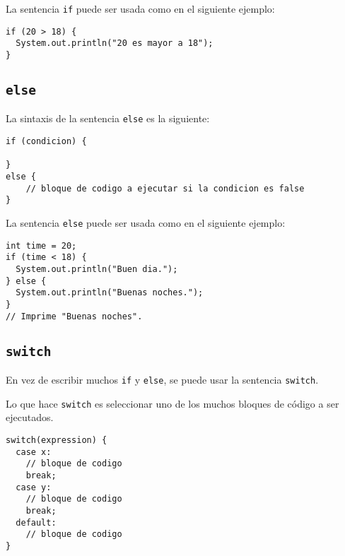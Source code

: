 \documentclass[12pt]{article}
\newcounter{it}
\theoremstyle{largebreak}
\begin{document}
    \begin{exa}
        La sentencia \lstinline|if| puede ser usada como en el siguiente ejemplo:
        \begin{lstlisting}[caption={Uso de la sentencia \lstinline|if|.},label=DescriptiveLabel]
if (20 > 18) {
  System.out.println("20 es mayor a 18");
}
        \end{lstlisting}
    \end{exa}

    \subsection{\lstinline|else|}

    La sintaxis de la sentencia \lstinline|else| es la siguiente:
    \begin{lstlisting}[caption={Sintaxis de la sentencia \lstinline|else|.},label=DescriptiveLabel]
if (condicion) {

}
else {
    // bloque de codigo a ejecutar si la condicion es false
}
    \end{lstlisting}

    \begin{exa}
        La sentencia \lstinline|else| puede ser usada como en el siguiente ejemplo:
        \begin{lstlisting}[caption={Uso de la sentencia \lstinline|else|.},label=DescriptiveLabel]
int time = 20;
if (time < 18) {
  System.out.println("Buen dia.");
} else {
  System.out.println("Buenas noches.");
}
// Imprime "Buenas noches".
        \end{lstlisting}
    \end{exa}

    \subsection{\lstinline|switch|}

    En vez de escribir muchos \lstinline|if| y \lstinline|else|, se puede usar la sentencia \lstinline|switch|.

    Lo que hace \lstinline|switch| es seleccionar uno de los muchos bloques de código a ser ejecutados.

    \begin{lstlisting}[caption={Sintaxis de la sentencia \lstinline|switch|.},label=DescriptiveLabel]
switch(expression) {
  case x:
    // bloque de codigo
    break;
  case y:
    // bloque de codigo
    break;
  default:
    // bloque de codigo
}
    \end{lstlisting}
\end{document}
